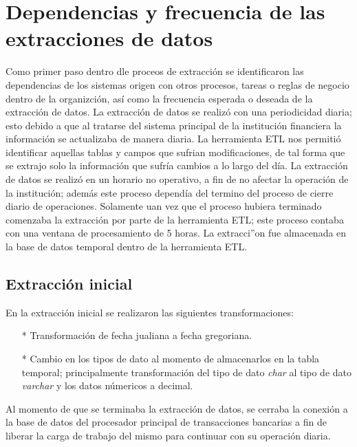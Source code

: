 \documentclass[a4paper,openright,12pt]{book}
\begin{document}
\section{Dependencias y frecuencia de las extracciones de datos}
Como primer paso dentro dle proceos de extracci\'on se identificaron las dependencias de los sistemas origen con otros procesos, tareas o reglas de negocio dentro de la organizci\'on, as\'i como la frecuencia esperada o deseada de la extracci\'on de datos. La extracci\'on de datos se realiz\'o con una periodicidad diaria; esto debido a que al tratarse del sistema principal de la instituci\'on financiera la informaci\'on se actualizaba de manera diaria. La herramienta ETL nos permiti\'o identificar aquellas tablas y campos que sufrian modificaciones, de tal forma que se extrajo solo la informaci\'on que sufr\'ia cambios a lo largo del d\'ia. La extracci\'on de datos se realiz\'o en un horario no operativo, a fin de no afectar la operaci\'on de la instituci\'on; adem\'as este proceso depend\'ia del termino del proceso de cierre diario de operaciones. Solamente uan vez que el proceso hubiera terminado comenzaba la extracci\'on por parte de la herramienta ETL; este proceso contaba con una ventana de procesamiento de 5 horas. La extracci''on fue almacenada en la base de datos temporal dentro de la herramienta ETL.
\subsection{Extracci\'on inicial}
En la extracci\'on inicial se realizaron las siguientes transformaciones:
\begin{itemize}
\item[*] Transformaci\'on de fecha jualiana a fecha gregoriana.
\item[*] Cambio en los tipos de dato al momento de almacenarlos en la tabla temporal; principalmente transformaci\'on del tipo de dato \textit{char} al tipo de dato \textit{varchar} y los datos n\'umericos a decimal.
\end{itemize}
Al momento de que se terminaba la extracci\'on de datos, se cerraba la conexi\'on a la base de datos del procesador principal de transacciones bancarias a fin de liberar la carga de trabajo del mismo para continuar con su operaci\'on diaria. 
\end{document}

